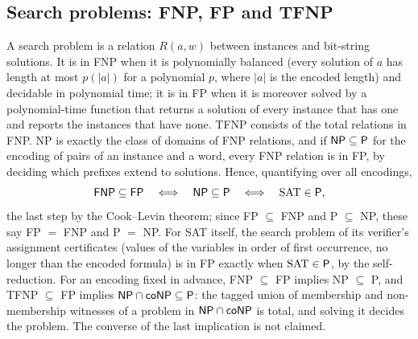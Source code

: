 \begin{result}
\subsection{Search problems: FNP, FP and TFNP}
A search problem is a relation $R(a,w)$ between instances and bit-string
solutions. It is in FNP when it is polynomially balanced (every solution
of $a$ has length at most $p(|a|)$ for a polynomial $p$, where $|a|$ is the
encoded length) and decidable in polynomial time; it is in FP when it is
moreover solved by a polynomial-time function that returns a solution of every
instance that has one and reports the instances that have none. TFNP consists
of the total relations in FNP. NP is exactly the class of domains of FNP
relations, and if $\mathsf{NP}\subseteq\mathsf{P}$ for the encoding of pairs of an
instance and a word, every FNP relation is in FP, by deciding which prefixes
extend to solutions. Hence, quantifying over all encodings,
\[
\mathsf{FNP}\subseteq\mathsf{FP}\quad\Longleftrightarrow\quad\mathsf{NP}\subseteq\mathsf{P}\quad\Longleftrightarrow\quad
\mathrm{SAT}\in\mathsf{P},
\]
the last step by the Cook--Levin theorem; since FP $\subseteq$ FNP and
P $\subseteq$ NP, these say FP $=$ FNP and P $=$ NP. For SAT itself, the search
problem of its verifier's assignment certificates (values of the variables in
order of first occurrence, no longer than the encoded formula) is in FP exactly
when $\mathrm{SAT}\in\mathsf{P}$, by the self-reduction. For an encoding fixed in advance, FNP $\subseteq$ FP implies
NP $\subseteq$ P, and TFNP $\subseteq$ FP implies
$\mathsf{NP}\cap\mathsf{coNP}\subseteq\mathsf{P}$: the tagged union of membership and
non-membership witnesses of a problem in $\mathsf{NP}\cap\mathsf{coNP}$ is total, and
solving it decides the problem. The converse of the last implication is not
claimed.\citep[Section 10.3]{Papadimitriou94}\citep{MegiddoPapadimitriou1991}


\end{result}
